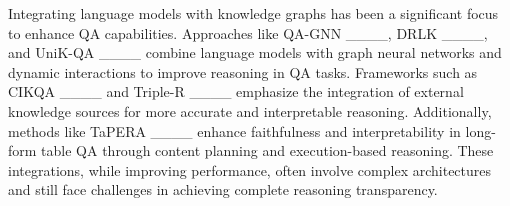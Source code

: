 Integrating language models with knowledge graphs has been a significant focus to enhance QA capabilities. Approaches like QA-GNN ____, DRLK ____, and UniK-QA ____ combine language models with graph neural networks and dynamic interactions to improve reasoning in QA tasks. Frameworks such as CIKQA ____ and Triple-R ____ emphasize the integration of external knowledge sources for more accurate and interpretable reasoning. Additionally, methods like TaPERA ____ enhance faithfulness and interpretability in long-form table QA through content planning and execution-based reasoning. These integrations, while improving performance, often involve complex architectures and still face challenges in achieving complete reasoning transparency.